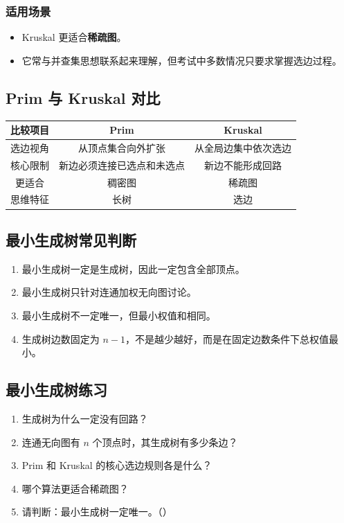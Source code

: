 \documentclass{../../note}
\begin{document}
\subsubsection{适用场景}

\begin{itemize}
  \item Kruskal 更适合\textbf{稀疏图}。
  \item 它常与并查集思想联系起来理解，但考试中多数情况只要求掌握选边过程。
\end{itemize}

\subsection{Prim 与 Kruskal 对比}

\begin{center}
\begin{tabular}{|c|c|c|}
\hline
比较项目 & Prim & Kruskal \\
\hline
选边视角 & 从顶点集合向外扩张 & 从全局边集中依次选边 \\
\hline
核心限制 & 新边必须连接已选点和未选点 & 新边不能形成回路 \\
\hline
更适合 & 稠密图 & 稀疏图 \\
\hline
思维特征 & 长树 & 选边 \\
\hline
\end{tabular}
\end{center}

\subsection{最小生成树常见判断}

\begin{enumerate}
  \item 最小生成树一定是生成树，因此一定包含全部顶点。
  \item 最小生成树只针对连通加权无向图讨论。
  \item 最小生成树不一定唯一，但最小权值和相同。
  \item 生成树边数固定为 $n-1$，不是越少越好，而是在固定边数条件下总权值最小。
\end{enumerate}

\subsection{最小生成树练习}

\begin{enumerate}
  \item 生成树为什么一定没有回路？
  \item 连通无向图有 $n$ 个顶点时，其生成树有多少条边？
  \item Prim 和 Kruskal 的核心选边规则各是什么？
  \item 哪个算法更适合稀疏图？
  \item 请判断：最小生成树一定唯一。（\hspace{1cm}）
\end{enumerate}
\end{document}

